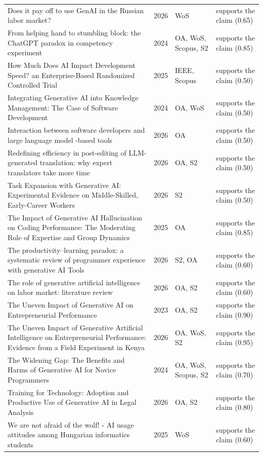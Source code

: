 \begin{longtable}{@{}%
  >{\raggedright\arraybackslash}p{}c%
  >{\raggedright\arraybackslash}p{}%
  >{\raggedright\arraybackslash}p{}@{}}
Does it pay off to use GenAI in the Russian labor market? & 2026 & WoS & supports the claim (0.65) \\
From helping hand to stumbling block: the ChatGPT paradox in competency experiment & 2024 & OA, WoS, Scopus, S2 & supports the claim (0.85) \\
How Much Does AI Impact Development Speed? an Enterprise-Based Randomized Controlled Trial & 2025 & IEEE, Scopus & supports the claim (0.50) \\
Integrating Generative AI into Knowledge Management: The Case of Software Development & 2024 & OA, WoS & supports the claim (0.50) \\
Interaction between software developers and large language model -based tools & 2026 & OA & supports the claim (0.50) \\
Redefining efficiency in post-editing of LLM-generated translation: why expert translators take more time & 2026 & OA, S2 & supports the claim (0.50) \\
Task Expansion with Generative AI: Experimental Evidence on Middle-Skilled, Early-Career Workers & 2026 & S2 & supports the claim (0.50) \\
The Impact of Generative AI Hallucination on Coding Performance: The Moderating Role of Expertise and Group Dynamics & 2025 & OA & supports the claim (0.85) \\
The productivity--learning paradox: a systematic review of programmer experience with generative AI Tools & 2026 & S2, OA & supports the claim (0.60) \\
The role of generative artificial intelligence on labor market: literature review & 2026 & OA, S2 & supports the claim (0.60) \\
The Uneven Impact of Generative AI on Entrepreneurial Performance & 2023 & OA, S2 & supports the claim (0.90) \\
The Uneven Impact of Generative Artificial Intelligence on Entrepreneurial Performance: Evidence from a Field Experiment in Kenya & 2026 & OA, WoS, S2 & supports the claim (0.95) \\
The Widening Gap: The Benefits and Harms of Generative AI for Novice Programmers & 2024 & OA, WoS, Scopus, S2 & supports the claim (0.70) \\
Training for Technology: Adoption and Productive Use of Generative AI in Legal Analysis & 2026 & OA, S2 & supports the claim (0.80) \\
We are not afraid of the wolf! - AI usage attitudes among Hungarian informatics students & 2025 & WoS & supports the claim (0.60) \\

\end{longtable}

